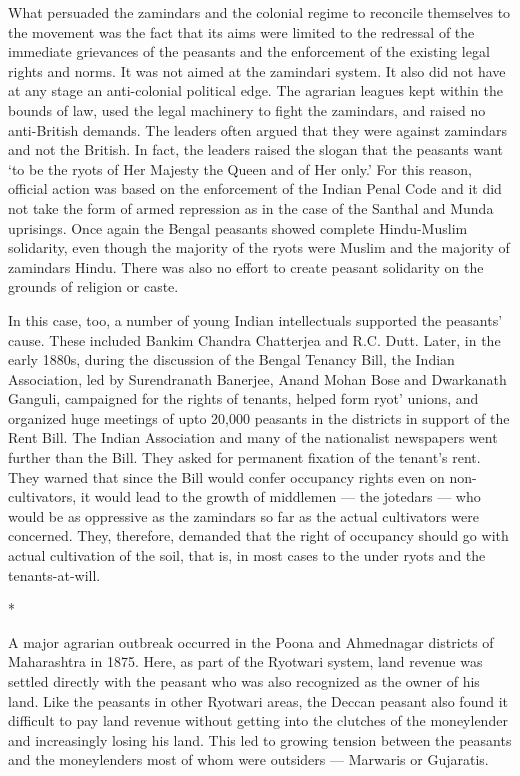 What persuaded the zamindars and the colonial regime to reconcile themselves to the movement was the fact that its aims were limited to the redressal of the immediate grievances of the peasants and the enforcement of the existing legal rights and norms. It was not aimed at the zamindari system. It also did not have at any stage an anti-colonial political edge. The agrarian leagues kept within the bounds of law, used the legal machinery to fight the zamindars, and raised no anti-British demands. The leaders often argued that they were against zamindars and not the British. In fact, the leaders raised the slogan that the peasants want ‘to be the ryots of Her Majesty the Queen and of Her only.’ For this reason, official action was based on the enforcement of the Indian Penal Code and it did not take the form of armed repression as in the case of the Santhal and Munda uprisings. Once again the Bengal peasants showed complete Hindu-Muslim solidarity, even though the majority of the ryots were Muslim and the majority of zamindars Hindu. There was also no effort to create peasant solidarity on the grounds of religion or caste.

In this case, too, a number of young Indian intellectuals supported the peasants’ cause. These included Bankim Chandra Chatterjea and R.C. Dutt. Later, in the early 1880s, during the discussion of the Bengal Tenancy Bill, the Indian Association, led by Surendranath Banerjee, Anand Mohan Bose and Dwarkanath Ganguli, campaigned for the rights of tenants, helped form ryot’ unions, and organized huge meetings of upto 20,000 peasants in the districts in support of the Rent Bill. The Indian Association and many of the nationalist newspapers went further than the Bill. They asked for permanent fixation of the tenant’s rent. They warned that since the Bill would confer occupancy rights even on non-cultivators, it would lead to the growth of middlemen — the jotedars — who would be as oppressive as the zamindars so far as the actual cultivators were concerned. They, therefore, demanded that the right of occupancy should go with actual cultivation of the soil, that is, in most cases to the under ryots and the tenants-at-will.

\begin{center}*\end{center}

A major agrarian outbreak occurred in the Poona and Ahmednagar districts of Maharashtra in 1875. Here, as part of the Ryotwari system, land revenue was settled directly with the peasant who was also recognized as the owner of his land. Like the peasants in other Ryotwari areas, the Deccan peasant also found it difficult to pay land revenue without getting into the clutches of the moneylender and increasingly losing his land. This led to growing tension between the peasants and the moneylenders most of whom were outsiders — Marwaris or Gujaratis.


